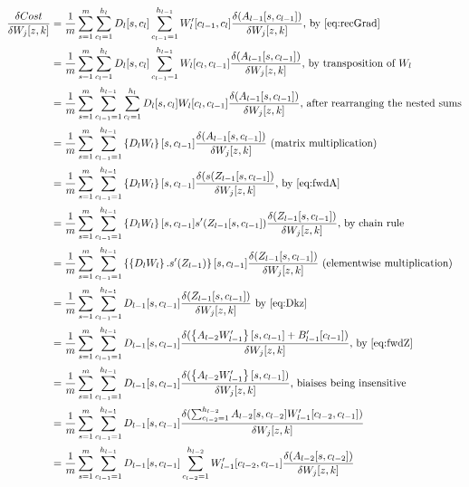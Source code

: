 \documentclass[]{article}
\begin{document}
\begin{align*}
\dfrac{\delta Cost}{\delta W_{j}[z,k]}&=\frac{1}{m}\sum_{s=1}^{m}\sum_{c_{l}=1}^{h_{l}}D_{l}[s,c_{l}] \sum_{c_{l-1}=1}^{h_{l-1}}W_{l}' [c_{l-1},c_{l}]\dfrac{\delta (A_{l-1}[s,c_{l-1}])}{\delta W_{j}[z,k]} \text{, by $\eqref{eq:recGrad}$}\\
&=\frac{1}{m}\sum_{s=1}^{m}\sum_{c_{l}=1}^{h_{l}}D_{l}[s,c_{l}] \sum_{c_{l-1}=1}^{h_{l-1}}W_{l} [c_{l},c_{l-1}]\dfrac{\delta (A_{l-1}[s,c_{l-1}])}{\delta W_{j}[z,k]} \text{, by transposition of $W_l$}\\
&=\frac{1}{m}\sum_{s=1}^{m} \sum_{c_{l-1}=1}^{h_{l-1}}\sum_{c_{l}=1}^{h_{l}}D_{l}[s,c_{l}]W_{l} [c_{l},c_{l-1}]\dfrac{\delta (A_{l-1}[s,c_{l-1}])}{\delta W_{j}[z,k]} \text{, after rearranging the nested sums}\\
&=\frac{1}{m}\sum_{s=1}^{m} \sum_{c_{l-1}=1}^{h_{l-1}} \left\lbrace D_{l}W_{l}\right\rbrace  [s,c_{l-1}]\dfrac{\delta (A_{l-1}[s,c_{l-1}])}{\delta W_{j}[z,k]} \text{ (matrix multiplication)}\\
&=\frac{1}{m}\sum_{s=1}^{m} \sum_{c_{l-1}=1}^{h_{l-1}} \left\lbrace D_{l}W_{l}\right\rbrace  [s,c_{l-1}]\dfrac{\delta (s(Z_{l-1}[s,c_{l-1}])}{\delta W_{j}[z,k]} \text{, by $\eqref{eq:fwdA}$}\\
&=\frac{1}{m}\sum_{s=1}^{m} \sum_{c_{l-1}=1}^{h_{l-1}} \left\lbrace D_{l}W_{l}\right\rbrace  [s,c_{l-1}]s'(Z_{l-1}[s,c_{l-1}])\dfrac{\delta (Z_{l-1}[s,c_{l-1}])}{\delta W_{j}[z,k]} \text{, by chain rule}\\
&=\frac{1}{m}\sum_{s=1}^{m} \sum_{c_{l-1}=1}^{h_{l-1}} \left\lbrace  \left\lbrace D_{l}W_{l}\right\rbrace . s'(Z_{l-1}) \right\rbrace [s,c_{l-1}]\dfrac{\delta (Z_{l-1}[s,c_{l-1}])}{\delta W_{j}[z,k]} \text{ (elementwise multiplication)}\\
&=\frac{1}{m}\sum_{s=1}^{m} \sum_{c_{l-1}=1}^{h_{l-1}} D_{l-1} [s,c_{l-1}]\dfrac{\delta (Z_{l-1}[s,c_{l-1}])}{\delta W_{j}[z,k]} \text{ by $\eqref{eq:Dkz}$}\\
&=\frac{1}{m}\sum_{s=1}^{m} \sum_{c_{l-1}=1}^{h_{l-1}} D_{l-1} [s,c_{l-1}]\dfrac{\delta (\left\lbrace A_{l-2}W_{l-1}' \right\rbrace [s,c_{l-1}] +B_{l-1}'[c_{l-1}])}{\delta W_{j}[z,k]} \text{, by $\eqref{eq:fwdZ}$}\\
&=\frac{1}{m}\sum_{s=1}^{m} \sum_{c_{l-1}=1}^{h_{l-1}} D_{l-1} [s,c_{l-1}]\dfrac{\delta (\left\lbrace A_{l-2}W_{l-1}' \right\rbrace [s,c_{l-1}])}{\delta W_{j}[z,k]} \text{, biaises being insensitive} \\
&=\frac{1}{m}\sum_{s=1}^{m} \sum_{c_{l-1}=1}^{h_{l-1}} D_{l-1} [s,c_{l-1}]\dfrac{\delta(\sum_{c_{l-2}=1}^{h_{l-2}} A_{l-2}[s,c_{l-2}] W_{l-1}' [c_{l-2},c_{l-1}] )}{\delta W_{j}[z,k]}\\
&=\frac{1}{m}\sum_{s=1}^{m} \sum_{c_{l-1}=1}^{h_{l-1}} D_{l-1} [s,c_{l-1}]\sum_{c_{l-2}=1}^{h_{l-2}}W_{l-1}' [c_{l-2},c_{l-1}] \dfrac{\delta  (A_{l-2}[s,c_{l-2}]  )}{\delta W_{j}[z,k]}\\
\end{align*}
\end{document}
